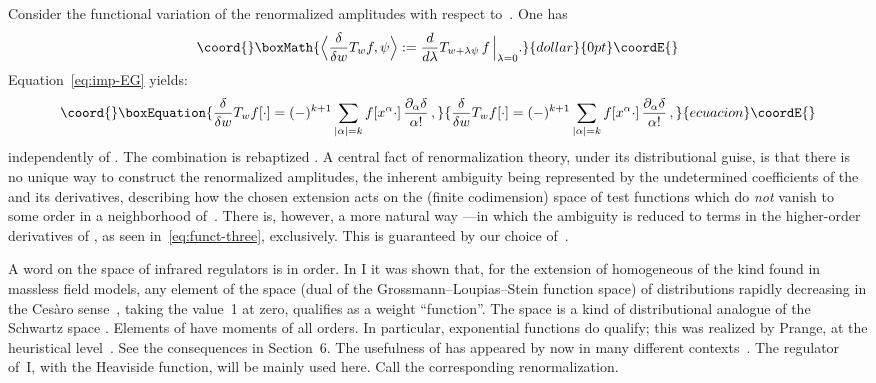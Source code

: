 \documentclass[a4paper,12pt]{article}
\renewcommand{\a}{\alpha}          %
\providecommand{\del}{\partial}        %
\providecommand{\dl}{\delta}           %
\providecommand{\K}{\mathcal{K}}       %
\providecommand{\la}{\lambda}          %
\renewcommand{\SS}{\mathcal{S}}    %
\providecommand{\7}{\dagger}           %
\theoremstyle{plain}
\theoremstyle{definition}
\begin{document}
Consider the functional variation of the renormalized amplitudes with
respect to~\coordHE{}. One has
$$\coord{}\boxMath{
\Bigl< \frac{\dl}{\dl w}T_w f, \psi \Bigr> :=
\frac{d}{d\la} T_{w+\la\psi}\,f\,\Bigr|_{\la=0}.
}{dollar}{0pt}\coordE{}$$
Equation~\eqref{eq:imp-EG} yields:
\begin{equation}\coord{}\boxEquation{
\frac{\dl}{\dl w}T_w f[\cdot] = (-)^{k+1}
\sum_{|\a| = k} f[x^\a\cdot]\, \frac{\del_\a\dl}{\a!}\,,
\label{eq:funct-three}
}{
\frac{\dl}{\dl w}T_w f[\cdot] = (-)^{k+1}
\sum_{|\a| = k} f[x^\a\cdot]\, \frac{\del_\a\dl}{\a!}\,,
}{ecuacion}\coordE{}\end{equation}
independently of \coordHE{}. The combination
\myHighlight{$\frac{(-)^{|\a|}}{\a!}\,\del_\a\dl$}\coordHE{} is rebaptized \myHighlight{$\dl_\a$}\coordHE{}. A central
fact of renormalization theory, under its distributional guise, is
that there is no unique way to construct the renormalized amplitudes,
the inherent ambiguity being represented by the undetermined
coefficients of the \myHighlight{$\delta$}\coordHE{} and its derivatives, describing how the
chosen extension acts on the (finite codimension) space of test
functions which do \textit{not} vanish to some order in a neighborhood
of~\coordHE{}. There is, however, a more natural way ---in which the
ambiguity is reduced to terms in the higher-order derivatives of
\myHighlight{$\delta$}\coordHE{}, as seen in~\eqref{eq:funct-three}, exclusively. This is
guaranteed by our choice of~\coordHE{}.

A word on the space of infrared regulators \coordHE{} is in order. In I it
was shown that, for the extension of homogeneous \coordHE{} of the kind found
in massless field models, any element of the space \myHighlight{$\K'$}\coordHE{} (dual of the
Grossmann--Loupias--Stein function space) of distributions rapidly
decreasing in the Ces\`aro sense~\cite{Odysseus}, taking the value~1
at zero, qualifies as a weight ``function''. The space \myHighlight{$\K'$}\coordHE{} is a kind
of distributional analogue of the Schwartz space \myHighlight{$\SS$}\coordHE{}. Elements of
\myHighlight{$\K'$}\coordHE{} have moments of all orders. In particular, exponential functions
\coordHE{} do qualify; this was realized by Prange, at the heuristical
level~\cite{PrangeA}. See the consequences in Section~6. The
usefulness of \myHighlight{$\K'$}\coordHE{} has appeared by now in many different
contexts~\cite{Hungarian}. The regulator \coordHE{}
of~I, with \coordHE{} the Heaviside function, will be mainly used here. Call
\coordHE{} the corresponding renormalization.
\end{document}
